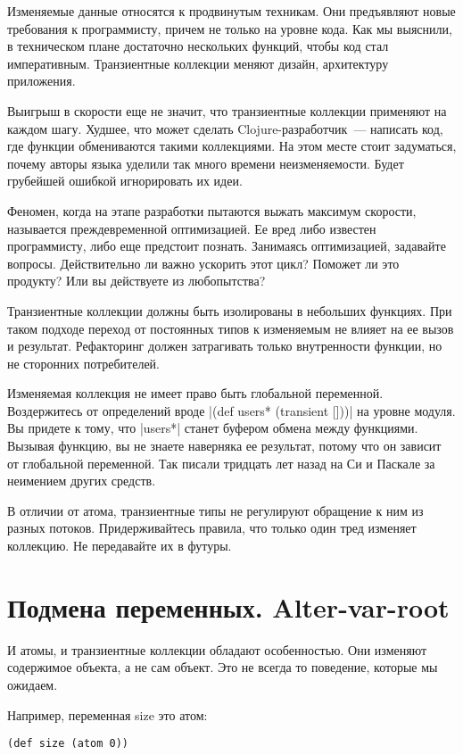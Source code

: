 Изменяемые данные относятся к продвинутым техникам. Они предъявляют новые
требования к программисту, причем не только на уровне кода. Как мы выяснили, в
техническом плане достаточно нескольких функций, чтобы код стал
императивным. Транзиентные коллекции меняют дизайн, архитектуру приложения.

Выигрыш в скорости еще не значит, что транзиентные коллекции применяют на каждом
шагу. Худшее, что может сделать Clojure-разработчик~--- написать код, где функции
обмениваются такими коллекциями. На этом месте стоит задуматься, почему авторы
языка уделили так много времени неизменяемости. Будет грубейшей ошибкой
игнорировать их идеи.

Феномен, когда на этапе разработки пытаются выжать максимум скорости, называется
преждевременной оптимизацией. Ее вред либо известен программисту, либо еще
предстоит познать. Занимаясь оптимизацией, задавайте вопросы. Действительно ли
важно ускорить этот цикл? Поможет ли это продукту? Или вы действуете из
любопытства?

Транзиентные коллекции должны быть изолированы в небольших функциях. При таком
подходе переход от постоянных типов к изменяемым не влияет на ее вызов и
результат. Рефакторинг должен затрагивать только внутренности функции, но не
сторонних потребителей.

Изменяемая коллекция не имеет право быть глобальной переменной. Воздержитесь от
определений вроде \spverb|(def users* (transient []))| на уровне модуля. Вы придете к
тому, что \spverb|users*| станет буфером обмена между функциями. Вызывая функцию, вы не
знаете наверняка ее результат, потому что он зависит от глобальной
переменной. Так писали тридцать лет назад на Си и Паскале за неимением других
средств.

В отличии от атома, транзиентные типы не регулируют обращение к ним из разных
потоков. Придерживайтесь правила, что только один тред изменяет коллекцию. Не
передавайте их в футуры.

\section{Подмена переменных. Alter-var-root}

И атомы, и транзиентные коллекции обладают особенностью. Они изменяют содержимое
объекта, а не сам объект. Это не всегда то поведение, которые мы ожидаем.

Например, переменная size это атом:

\begin{verbatim}
(def size (atom 0))
\end{verbatim}

